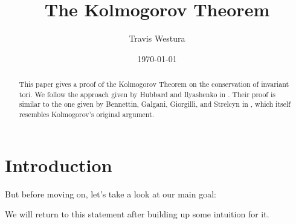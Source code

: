 \documentclass[twoside,letterpaper,10pt]{article}
\title{The Kolmogorov Theorem}
\author{Travis Westura}
\date{\today}
\begin{document}
\maketitle

\section{Introduction}
\label{sec:introduction}

\begin{abstract}
  This paper gives a proof of the Kolmogorov Theorem on the conservation of
  invariant tori.
  We follow the approach given by Hubbard and Ilyashenko in .
  Their proof is similar to the one given by Bennettin, Galgani, Giorgilli, and
  Strelcyn in , which itself resembles Kolmogorov's original argument.
\end{abstract}


But before moving on, let's take a look at our main goal:
\begin{thm}
  \label{thm:KAM}
  \KAM
\end{thm}
We will return to this statement after building up some intuition for it.
\end{document}
